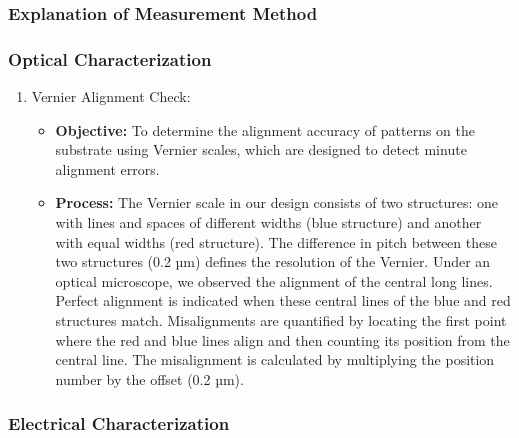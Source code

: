 \pagebreak

\subsubsection{Explanation of Measurement Method}
\subsubsection*{Optical Characterization}

\begin{enumerate}
    \item Vernier Alignment Check:
    \begin{itemize}
        \item \textbf{Objective:} To determine the alignment accuracy of patterns on the substrate using Vernier scales, which are designed to detect minute alignment errors.
        \item \textbf{Process:} The Vernier scale in our design consists of two structures: one with lines and spaces of different widths (blue structure) and another with equal widths (red structure). The difference in pitch between these two structures (0.2 µm) defines the resolution of the Vernier. Under an optical microscope, we observed the alignment of the central long lines. Perfect alignment is indicated when these central lines of the blue and red structures match. Misalignments are quantified by locating the first point where the red and blue lines align and then counting its position from the central line. The misalignment is calculated by multiplying the position number by the offset (0.2 µm).
    \end{itemize}
\end{enumerate}

\subsubsection*{Electrical Characterization}

